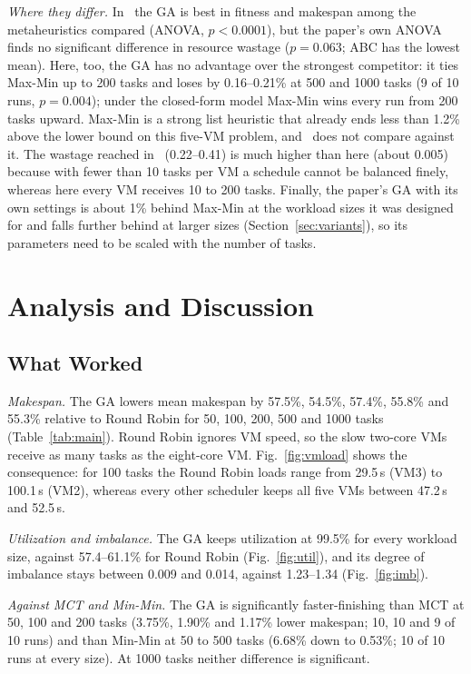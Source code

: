 \documentclass[journal,onecolumn,12pt]{IEEEtran}
\begin{document}
\textit{Where they differ.} In~\cite{dehury} the GA is best in fitness and makespan among the metaheuristics compared (ANOVA, $p<0.0001$), but the paper's own ANOVA finds no significant difference in resource wastage ($p=0.063$; ABC has the lowest mean). Here, too, the GA has no advantage over the strongest competitor: it ties Max-Min up to 200 tasks and loses by 0.16--0.21\% at 500 and 1000 tasks (9 of 10 runs, $p=0.004$); under the closed-form model Max-Min wins every run from 200 tasks upward. Max-Min is a strong list heuristic that already ends less than 1.2\% above the lower bound on this five-VM problem, and~\cite{dehury} does not compare against it. The wastage reached in~\cite{dehury} (0.22--0.41) is much higher than here (about 0.005) because with fewer than 10 tasks per VM a schedule cannot be balanced finely, whereas here every VM receives 10 to 200 tasks. Finally, the paper's GA with its own settings is about 1\% behind Max-Min at the workload sizes it was designed for and falls further behind at larger sizes (Section~\ref{sec:variants}), so its parameters need to be scaled with the number of tasks.

\section{Analysis and Discussion}\label{sec:discussion}

\subsection{What Worked}
\textit{Makespan.} The GA lowers mean makespan by 57.5\%, 54.5\%, 57.4\%, 55.8\% and 55.3\% relative to Round Robin for 50, 100, 200, 500 and 1000 tasks (Table~\ref{tab:main}). Round Robin ignores VM speed, so the slow two-core VMs receive as many tasks as the eight-core VM. Fig.~\ref{fig:vmload} shows the consequence: for 100 tasks the Round Robin loads range from 29.5\,s (VM3) to 100.1\,s (VM2), whereas every other scheduler keeps all five VMs between 47.2\,s and 52.5\,s.

\textit{Utilization and imbalance.} The GA keeps utilization at 99.5\% for every workload size, against 57.4--61.1\% for Round Robin (Fig.~\ref{fig:util}), and its degree of imbalance stays between 0.009 and 0.014, against 1.23--1.34 (Fig.~\ref{fig:imb}).

\textit{Against MCT and Min-Min.} The GA is significantly faster-finishing than MCT at 50, 100 and 200 tasks (3.75\%, 1.90\% and 1.17\% lower makespan; 10, 10 and 9 of 10 runs) and than Min-Min at 50 to 500 tasks (6.68\% down to 0.53\%; 10 of 10 runs at every size). At 1000 tasks neither difference is significant.
\end{document}
